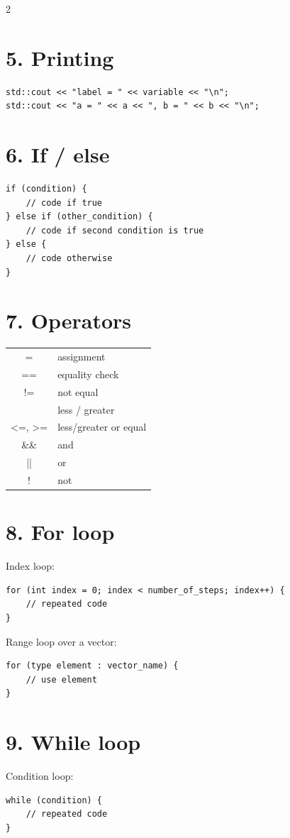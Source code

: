 \documentclass[10pt]{article}
\begin{document}
\begin{multicols}{2}
\section{5. Printing}
\begin{lstlisting}[style=cppstyle]
std::cout << "label = " << variable << "\n";
std::cout << "a = " << a << ", b = " << b << "\n";
\end{lstlisting}

\section{6. If / else}
\begin{lstlisting}[style=cppstyle]
if (condition) {
    // code if true
} else if (other_condition) {
    // code if second condition is true
} else {
    // code otherwise
}
\end{lstlisting}

\section{7. Operators}
\begin{center}
\begin{tabular}{>{\ttfamily}c l}
\hline
= & assignment \\
== & equality check \\
!= & not equal \\
<, > & less / greater \\
<=, >= & less/greater or equal \\
\&\& & and \\
|| & or \\
! & not \\
\hline
\end{tabular}
\end{center}

\section{8. For loop}
Index loop:
\begin{lstlisting}[style=cppstyle]
for (int index = 0; index < number_of_steps; index++) {
    // repeated code
}
\end{lstlisting}

Range loop over a vector:
\begin{lstlisting}[style=cppstyle]
for (type element : vector_name) {
    // use element
}
\end{lstlisting}

\section{9. While loop}
Condition loop:
\begin{lstlisting}[style=cppstyle]
while (condition) {
    // repeated code
}
\end{lstlisting}


\end{multicols}
\end{document}
